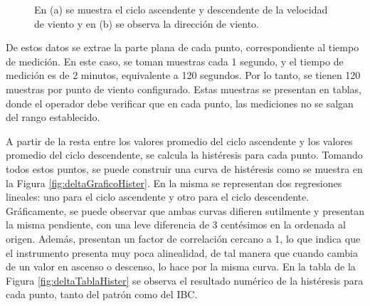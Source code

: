 \begin{figure}[H]
    \centering
    \begin{minipage}[b]{1\textwidth}
        \centering
    \end{minipage}  
    \hspace{2em} %
    \begin{minipage}[b]{1\textwidth}
        \centering
    \end{minipage}  
    \caption{En (a) se muestra el ciclo ascendente y descendente de la velocidad de viento y en (b) se observa la dirección de viento.}
    \label{fig:deltaDatosCrudos}
\end{figure}

De estos datos se extrae la parte plana de cada punto, correspondiente al tiempo de medición. En este caso, se toman muestras cada 1 segundo, y el tiempo de medición es de 2 minutos, equivalente a 120 segundos. Por lo tanto, se tienen 120 muestras por punto de viento configurado. Estas muestras se presentan en tablas, donde el operador debe verificar que en cada punto, las mediciones no se salgan del rango establecido.

A partir de la resta entre los valores promedio del ciclo ascendente y los valores promedio del ciclo descendente, se calcula la histéresis para cada punto. Tomando todos estos puntos, se puede construir una curva de histéresis como se muestra en la Figura \ref{fig:deltaGraficoHister}. En la misma se representan dos regresiones lineales: uno para el ciclo ascendente y otro para el ciclo descendente. Gráficamente, se puede observar que ambas curvas difieren sutilmente y presentan la misma pendiente, con una leve diferencia de 3 centésimos en la ordenada al origen. Además, presentan un factor de correlación cercano a 1, lo que indica que el instrumento presenta muy poca alinealidad, de tal manera que cuando cambia de un valor en ascenso o descenso, lo hace por la misma curva. En la tabla de la Figura \ref{fig:deltaTablaHister} se observa el resultado numérico de la histéresis para cada punto, tanto del patrón como del IBC.

